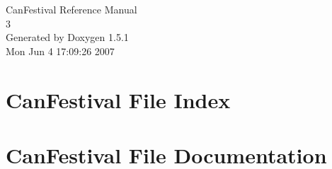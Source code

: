 \documentclass[a4paper]{book}
\begin{document}
\begin{titlepage}
\vspace*{7cm}
\begin{center}
{\Large Can\-Festival Reference Manual\\[1ex]\large 3 }\\
\vspace*{1cm}
{\large Generated by Doxygen 1.5.1}\\
\vspace*{0.5cm}
{\small Mon Jun 4 17:09:26 2007}\\
\end{center}
\end{titlepage}
\clearemptydoublepage
{}
\tableofcontents
\clearemptydoublepage
{}
\chapter{Can\-Festival File Index}

\chapter{Can\-Festival File Documentation}











\printindex
\end{document}
